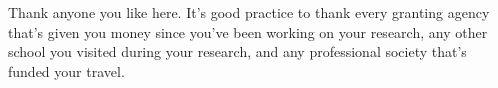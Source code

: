 \acknowledgements

\setcounter{page}{2}

Thank anyone you like here.  It's good practice to thank every granting agency that's given you money
since you've been working on your research, any other school you visited during your research,
and any professional society that's funded your travel.
